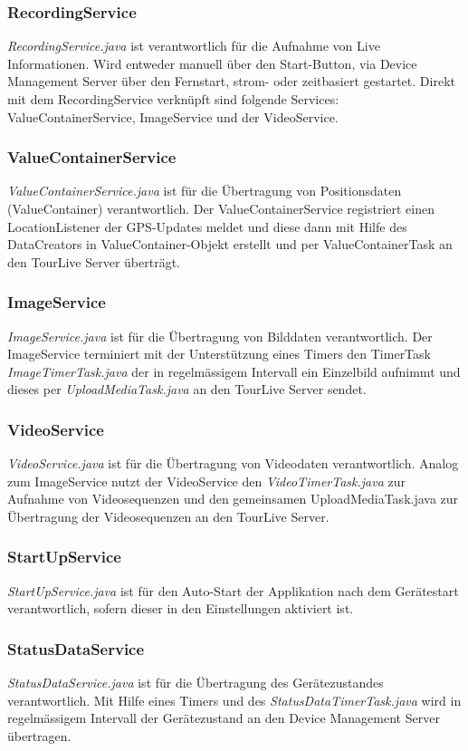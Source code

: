 \subsubsection{RecordingService} 
\textit{RecordingService.java} ist verantwortlich für die Aufnahme von Live Informationen. Wird entweder manuell über den Start-Button, via Device Management Server über den Fernstart, strom- oder zeitbasiert gestartet. Direkt mit dem RecordingService verknüpft sind folgende Services: ValueContainerService, ImageService und der VideoService.
\subsubsection{ValueContainerService} 
\textit{ValueContainerService.java} ist für die Übertragung von Positionsdaten (ValueContainer) verantwortlich. Der ValueContainerService registriert einen LocationListener der GPS-Updates meldet und diese dann mit Hilfe des DataCreators in ValueContainer-Objekt erstellt und per ValueContainerTask an den TourLive Server überträgt.
\subsubsection{ImageService} 
\textit{ImageService.java} ist für die Übertragung von Bilddaten verantwortlich. Der ImageService terminiert mit der Unterstützung eines Timers den TimerTask \textit{ImageTimerTask.java} der in regelmässigem Intervall ein Einzelbild aufnimmt und dieses per \textit{UploadMediaTask.java} an den TourLive Server sendet. 
\subsubsection{VideoService} 
\textit{VideoService.java} ist für die  Übertragung von Videodaten verantwortlich. Analog zum ImageService nutzt der VideoService den \textit{VideoTimerTask.java} zur Aufnahme von Videosequenzen und den gemeinsamen UploadMediaTask.java zur Übertragung der Videosequenzen an den TourLive Server.
\subsubsection{StartUpService} 
\textit{StartUpService.java} ist für den Auto-Start der Applikation nach dem Gerätestart verantwortlich, sofern dieser in den Einstellungen aktiviert ist.
\subsubsection{StatusDataService} 
\textit{StatusDataService.java} ist für die  Übertragung des Gerätezustandes verantwortlich. Mit Hilfe eines Timers und des \textit{StatusDataTimerTask.java} wird in regelmässigem Intervall der Gerätezustand an den Device Management Server übertragen.

